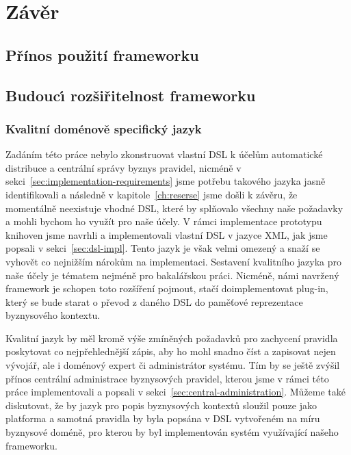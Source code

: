 

\chapter{Závěr}\label{ch:zaver}

\section{Přínos použití frameworku}



\section{Budouc\'{\i} rozšiřitelnost frameworku}

\subsection{Kvalitní doménově specifický jazyk}
Zadáním této práce nebylo zkonstruovat vlastní \gls{DSL}
k účelům automatické distribuce a centrální správy byznys pravidel,
nicméně v sekci~\ref{sec:implementation-requirements} jsme potřebu takového
jazyka jasně identifikovali a následně v kapitole~\ref{ch:reserse}
jsme došli k závěru, že momentálně neexistuje vhodné \gls{DSL},
které by splňovalo všechny naše požadavky a mohli bychom ho
využít pro naše účely. V rámci implementace prototypu knihoven
jsme navrhli a implementovali vlastní \gls{DSL} v jazyce \gls{XML},
jak jsme popsali v sekci~\ref{sec:dsl-impl}. Tento jazyk je však
velmi omezený a snaží se vyhovět co nejnižším nárokům na implementaci.
Sestavení kvalitního jazyka pro naše účely je tématem nejméně pro
bakalářskou práci. Nicméně, námi navržený framework je schopen toto
rozšíření pojmout, stačí doimplementovat plug-in, který se bude starat
o převod z daného \gls{DSL} do paměťové reprezentace byznysového kontextu.

Kvalitní jazyk by měl kromě výše zmíněných požadavků pro zachycení
pravidla poskytovat co nejpřehlednější zápis, aby ho mohl snadno číst a zapisovat
nejen vývojář, ale i doménový expert či administrátor systému. Tím by se
ještě zvýšil přínos centrální administrace byznysových pravidel, kterou jsme v rámci
této práce implementovali a popsali v sekci~\ref{sec:central-administration}.
Můžeme také diskutovat, že by jazyk pro popis byznysových kontextů sloužil pouze
jako platforma a samotná pravidla by byla popsána v \gls{DSL} vytvořeném na míru
byznysové doméně, pro kterou by byl implementován systém využívající našeho frameworku.

